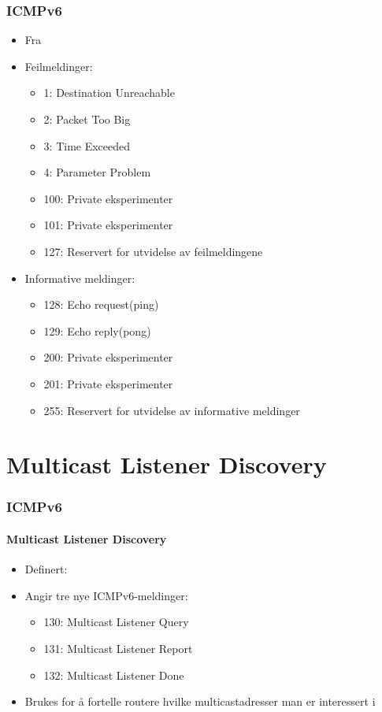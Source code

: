\begin{frame}
  \frametitle{ICMPv6}
  \begin{itemize}
  \item Fra 
  \item Feilmeldinger:
    \begin{itemize}
    \item 1: Destination Unreachable
    \item 2: Packet Too Big
    \item 3: Time Exceeded
    \item 4: Parameter Problem
    \item 100: Private eksperimenter
    \item 101: Private eksperimenter
    \item 127: Reservert for utvidelse av feilmeldingene
    \end{itemize}
  \item Informative meldinger:
    \begin{itemize}
    \item 128: Echo request\hfill(ping)
    \item 129: Echo reply\hfill(pong)
    \item 200: Private eksperimenter
    \item 201: Private eksperimenter
    \item 255: Reservert for utvidelse av informative meldinger
    \end{itemize}
  \end{itemize}
\end{frame}

\section{Multicast Listener Discovery}
\begin{frame}
  \frametitle{ICMPv6}
  \framesubtitle{Multicast Listener Discovery}
  \begin{itemize}
  \item Definert: 
  \item Angir tre nye ICMPv6-meldinger:
    \begin{itemize}
    \item 130: Multicast Listener Query
    \item 131: Multicast Listener Report
    \item 132: Multicast Listener Done
    \end{itemize}
  \item Brukes for å fortelle routere hvilke multicastadresser man er
    interessert i
  \end{itemize}
\end{frame}

